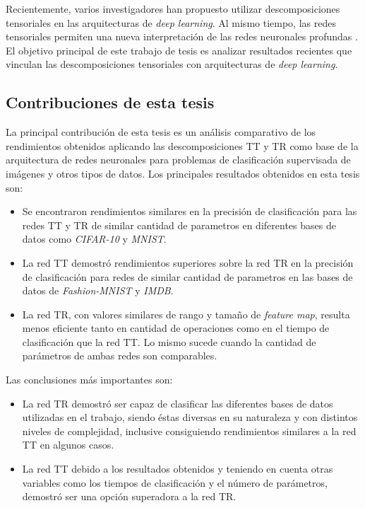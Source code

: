 \documentclass[spanish]{article}
\theoremstyle{definition}
\theoremstyle{remark}
\numberwithin{equation}{section}
\numberwithin{equation}{section} %
\begin{document}
Recientemente, varios investigadores han propuesto utilizar descomposiciones tensoriales en las arquitecturas de {\it deep learning}. Al mismo tiempo, las redes tensoriales permiten una nueva interpretación de las redes neuronales profundas  \cite{novikov2015tensorizing,garipov2016ultimate,cohen2016expressive,khrulkov2017expressive,cichocki2016tensor,cichocki2017tensor}. El objetivo principal de este trabajo de tesis es analizar resultados recientes que vinculan las descomposiciones tensoriales con arquitecturas de {\it deep learning}.\par
\subsection{Contribuciones de esta tesis}
\noindent
La principal contribución de esta tesis es un análisis comparativo de los rendimientos obtenidos aplicando las descomposiciones TT y TR como base de la arquitectura de redes neuronales para problemas de clasificación supervisada de imágenes y otros tipos de datos. Los principales resultados obtenidos en esta tesis son:
\begin{itemize}
  \item Se encontraron rendimientos similares en la precisión de clasificación para las redes TT y TR de similar cantidad de parametros en diferentes bases de datos como \textit{CIFAR-10} y \textit{MNIST}.
  \item La red TT demostró rendimientos superiores sobre la red TR en la precisión de clasificación para redes de similar cantidad de parametros en las bases de datos de \textit{Fashion-MNIST} y \textit{IMDB}.
  \item La red TR, con valores similares de rango y tamaño de \textit{feature map}, resulta menos eficiente tanto en cantidad de operaciones como en el tiempo de clasificación que la red TT. Lo mismo sucede cuando la cantidad de parámetros de ambas redes son comparables.
\end{itemize}
Las conclusiones más importantes son:
\begin{itemize}
  \item La red TR demostró ser capaz de clasificar las diferentes bases de datos utilizadas en el trabajo, siendo  éstas diversas en su naturaleza y con distintos niveles de complejidad, inclusive consiguiendo rendimientos similares a la red TT en algunos casos.
  \item La red TT debido a los resultados obtenidos y teniendo en cuenta otras variables como los tiempos de clasificación y el número de parámetros, demostró ser una opción superadora a la red TR.
\end{itemize}
\end{document}
